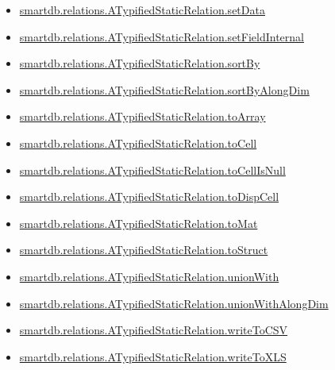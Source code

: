 \documentclass[letterpaper,10pt,english]{sphinxmanual}
\begin{document}
\begin{itemize}
\item {} 
{\hyperref[chap_func:smartdb-relations-atypifiedstaticrelation-setdata]{smartdb.relations.ATypifiedStaticRelation.setData}}

\item {} 
{\hyperref[chap_func:smartdb-relations-atypifiedstaticrelation-setfieldinternal]{smartdb.relations.ATypifiedStaticRelation.setFieldInternal}}

\item {} 
{\hyperref[chap_func:smartdb-relations-atypifiedstaticrelation-sortby]{smartdb.relations.ATypifiedStaticRelation.sortBy}}

\item {} 
{\hyperref[chap_func:smartdb-relations-atypifiedstaticrelation-sortbyalongdim]{smartdb.relations.ATypifiedStaticRelation.sortByAlongDim}}

\item {} 
{\hyperref[chap_func:smartdb-relations-atypifiedstaticrelation-toarray]{smartdb.relations.ATypifiedStaticRelation.toArray}}

\item {} 
{\hyperref[chap_func:smartdb-relations-atypifiedstaticrelation-tocell]{smartdb.relations.ATypifiedStaticRelation.toCell}}

\item {} 
{\hyperref[chap_func:smartdb-relations-atypifiedstaticrelation-tocellisnull]{smartdb.relations.ATypifiedStaticRelation.toCellIsNull}}

\item {} 
{\hyperref[chap_func:smartdb-relations-atypifiedstaticrelation-todispcell]{smartdb.relations.ATypifiedStaticRelation.toDispCell}}

\item {} 
{\hyperref[chap_func:smartdb-relations-atypifiedstaticrelation-tomat]{smartdb.relations.ATypifiedStaticRelation.toMat}}

\item {} 
{\hyperref[chap_func:smartdb-relations-atypifiedstaticrelation-tostruct]{smartdb.relations.ATypifiedStaticRelation.toStruct}}

\item {} 
{\hyperref[chap_func:smartdb-relations-atypifiedstaticrelation-unionwith]{smartdb.relations.ATypifiedStaticRelation.unionWith}}

\item {} 
{\hyperref[chap_func:smartdb-relations-atypifiedstaticrelation-unionwithalongdim]{smartdb.relations.ATypifiedStaticRelation.unionWithAlongDim}}

\item {} 
{\hyperref[chap_func:smartdb-relations-atypifiedstaticrelation-writetocsv]{smartdb.relations.ATypifiedStaticRelation.writeToCSV}}

\item {} 
{\hyperref[chap_func:smartdb-relations-atypifiedstaticrelation-writetoxls]{smartdb.relations.ATypifiedStaticRelation.writeToXLS}}

\end{itemize}
\end{document}
